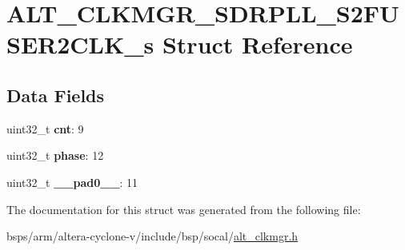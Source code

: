 \hypertarget{structALT__CLKMGR__SDRPLL__S2FUSER2CLK__s}{}\section{A\+L\+T\+\_\+\+C\+L\+K\+M\+G\+R\+\_\+\+S\+D\+R\+P\+L\+L\+\_\+\+S2\+F\+U\+S\+E\+R2\+C\+L\+K\+\_\+s Struct Reference}
\label{structALT__CLKMGR__SDRPLL__S2FUSER2CLK__s}
\subsection*{Data Fields}
\begin{DoxyCompactItemize}
\item 
\mbox{\label{structALT__CLKMGR__SDRPLL__S2FUSER2CLK__s_a579e55e79f674cc3961edb45cd625e73}} 
uint32\+\_\+t {\bfseries cnt}\+: 9
\item 
\mbox{\label{structALT__CLKMGR__SDRPLL__S2FUSER2CLK__s_a40cb2e14c5c38ef61a548fde6015d90b}} 
uint32\+\_\+t {\bfseries phase}\+: 12
\item 
\mbox{\label{structALT__CLKMGR__SDRPLL__S2FUSER2CLK__s_ad798235060100da760e14c2ed30f0f94}} 
uint32\+\_\+t {\bfseries \+\_\+\+\_\+pad0\+\_\+\+\_\+}\+: 11
\end{DoxyCompactItemize}


The documentation for this struct was generated from the following file\+:\begin{DoxyCompactItemize}
\item 
bsps/arm/altera-\/cyclone-\/v/include/bsp/socal/\mbox{\hyperlink{alt__clkmgr_8h}{alt\+\_\+clkmgr.\+h}}\end{DoxyCompactItemize}
